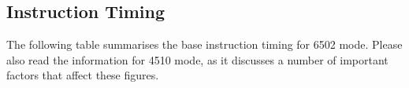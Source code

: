 \begin{center}
\end{center}

\subsection{Instruction Timing}

The following table summarises the base instruction timing for 6502 mode.
Please also read the information for 4510 mode, as it discusses a number
of important factors that affect these figures.

\begin{center}
\end{center}



